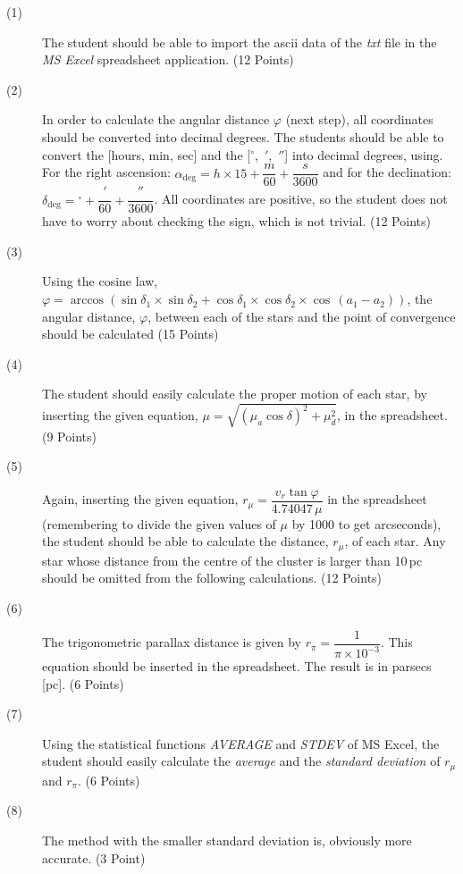 \begin{description}
\item[(1)] The student should be able to import the ascii data of the
  \emph{txt} file in the \emph{MS Excel} spreadsheet application.
  \hfill(12 Points)
\item[(2)] In order to calculate the angular distance $\varphi$ (next step),
  all coordinates should be converted into decimal degrees. The students
  should be able to convert the [hours, min, sec] and the
  [$^\circ$,\ $'$,\ $''$] into decimal degrees, using. %
  For the right ascension:
  $\alpha_{\deg} = h\times15 + \dfrac{m}{60} + \dfrac{s}{3600}$
  and for the declination:
  $\delta_{\deg} = {}^\circ + \dfrac{'}{60} + \dfrac{''}{3600}$.
  All coordinates are positive, so the student does not have to worry about
  checking the sign, which is not trivial. \hfill(12 Points)
\item[(3)] Using the cosine law,
  $\varphi = \arccos(\sin\delta_1\times\sin\delta_2
    + \cos\delta_1\times\cos\delta_2\times\cos\,(a_1 - a_2))$,
  the angular distance, $\varphi$, between each of the stars and the point of
  convergence should be calculated \hfill(15 Points)
\item[(4)] The student should easily calculate the proper motion of each
  star, by inserting the given equation,
  $\mu = \sqrt{(\mu_a\cos\delta)^2 + \mu_d^2}$, in the spreadsheet.
  \hfill(9 Points)
\item[(5)] Again, inserting the given equation,
  $r_\mu = \dfrac{v_r\tan\varphi}{4.74047\,\mu}$ in the spreadsheet
  (remembering to divide the given values of $\mu$ by 1000 to get arcseconds),
  the student should be able to calculate the distance, $r_\mu$, of each star.
  Any star whose distance from the centre of the cluster is larger than
  10\,pc should be omitted from the following calculations. \hfill(12 Points)
\item[(6)] The trigonometric parallax distance is given by
  $r_\pi = \dfrac{1}{\pi\times10^{-3}}$. This equation should be inserted in
  the spreadsheet. The result is in parsecs [pc]. \hfill(6 Points)
\item[(7)] Using the statistical functions \emph{AVERAGE} and \emph{STDEV} of
  MS Excel, the student should easily calculate the \emph{average} and the
  \emph{standard deviation} of $r_\mu$ and $r_\pi$. \hfill(6 Points)
\item[(8)] The method with the smaller standard deviation is, obviously more
  accurate. \hfill(3 Point)
\end{description}

